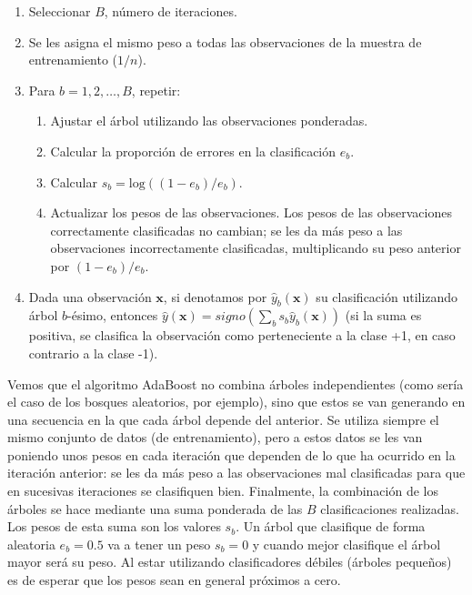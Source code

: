 \documentclass[
  spanish,
]{book}
\theoremstyle{break}
\theoremstyle{definition}
\theoremstyle{definition}
\theoremstyle{definition}
\theoremstyle{definition}
\theoremstyle{remark}
\begin{document}
\begin{enumerate}
\def\labelenumi{\arabic{enumi}.}
\item
  Seleccionar \(B\), número de iteraciones.
\item
  Se les asigna el mismo peso a todas las observaciones de la muestra de entrenamiento (\(1/n\)).
\item
  Para \(b = 1, 2,\ldots, B\), repetir:

  \begin{enumerate}
  \def\labelenumii{\alph{enumii}.}
  \item
    Ajustar el árbol utilizando las observaciones ponderadas.
  \item
    Calcular la proporción de errores en la clasificación \(e_b\).
  \item
    Calcular \(s_b = \text{log}((1 - e_b)/e_b)\).
  \item
    Actualizar los pesos de las observaciones. Los pesos de las observaciones correctamente clasificadas no cambian; se les da más peso a las observaciones incorrectamente clasificadas, multiplicando su peso anterior por \((1 - e_b)/e_b\).
  \end{enumerate}
\item
  Dada una observación \(\mathbf{x}\), si denotamos por \(\hat y_b ( \mathbf{x} )\) su clasificación utilizando árbol \(b\)-ésimo, entonces \(\hat y( \mathbf{x} ) = signo \left( \sum_b s_b \hat y_b ( \mathbf{x} ) \right)\) (si la suma es positiva, se clasifica la observación como perteneciente a la clase +1, en caso contrario a la clase -1).
\end{enumerate}

Vemos que el algoritmo AdaBoost no combina árboles independientes (como sería el caso de los bosques aleatorios, por ejemplo), sino que estos se van generando en una secuencia en la que cada árbol depende del anterior. Se utiliza siempre el mismo conjunto de datos (de entrenamiento), pero a estos datos se les van poniendo unos pesos en cada iteración que dependen de lo que ha ocurrido en la iteración anterior: se les da más peso a las observaciones mal clasificadas para que en sucesivas iteraciones se clasifiquen bien. Finalmente, la combinación de los árboles se hace mediante una suma ponderada de las \(B\) clasificaciones realizadas. Los pesos de esta suma son los valores \(s_b\). Un árbol que clasifique de forma aleatoria \(e_b = 0.5\) va a tener un peso \(s_b = 0\) y cuando mejor clasifique el árbol mayor será su peso. Al estar utilizando clasificadores débiles (árboles pequeños) es de esperar que los pesos sean en general próximos a cero.
\end{document}
